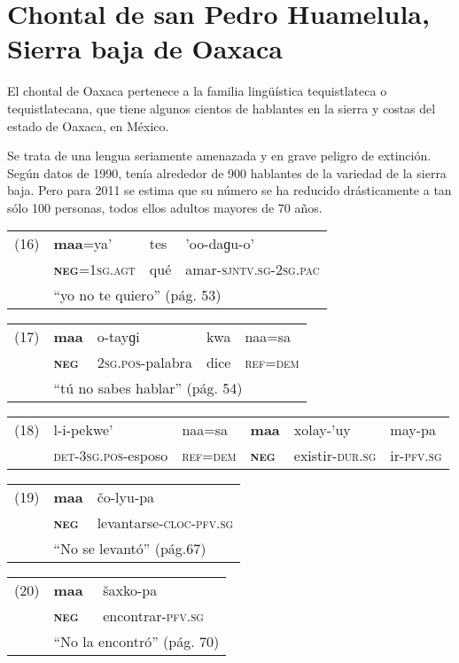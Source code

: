 \section*{Chontal de san Pedro Huamelula, Sierra baja de Oaxaca}

\noindent El chontal de Oaxaca pertenece a la familia lingüística tequistlateca o tequistlatecana, que tiene algunos cientos de hablantes en la sierra y costas del estado de Oaxaca, en México.

Se trata de una lengua seriamente amenazada y en grave peligro de extinción. Según datos de 1990, tenía alrededor de 900 hablantes de la variedad de la sierra baja. Pero para 2011 se estima que su número se ha reducido drásticamente a tan sólo 100 personas, todos ellos adultos mayores de 70 años. \vspace{0.5cm}

{\setmainfont{Charis SIL}

\begin{tabular}{llll}
(16) & \textbf{maa}=ya'& tes & 'oo-daɡu-o' \\
& \textsc{\textbf{neg}}=\textsc{1sg.agt} & qué & amar-\textsc{sjntv.sg-2sg.pac} \\
& \multicolumn{3}{l}{``yo no te quiero'' (pág. 53)}
\end{tabular} \vspace{0.5cm}

\begin{tabular}{lllll}
(17) & \textbf{maa} & o-tayɡi & kwa & naa=sa \\
& \textsc{\textbf{neg}} & \textsc{2sg.pos}-palabra & dice & \textsc{ref=dem} \\
& \multicolumn{4}{l}{``tú no sabes hablar'' (pág. 54)}
\end{tabular} \vspace{0.5cm}

\begin{tabular}{llllll}
(18) & l-i-pekwe’ & naa=sa & \textbf{maa} & xolay-’uy & may-pa \\
& \textsc{det-3sg.pos}-esposo & \textsc{ref=dem} & \textsc{\textbf{neg}} & existir-\textsc{dur.sg} & ir-\textsc{pfv.sg} \\
\end{tabular} \vspace{0.5cm}

\begin{tabular}{lll}
(19) & \textbf{maa} & čo-lyu-pa \\
& \textsc{\textbf{neg}} & levantarse-\textsc{cloc-pfv.sg} \\
& \multicolumn{2}{l}{``No se levantó'' (pág.67)}
\end{tabular} \vspace{0.5cm}

\begin{tabular}{lll}
(20) & \textbf{maa} & šaxko-pa \\
& \textsc{\textbf{neg}} & encontrar-\textsc{pfv.sg} \\
& \multicolumn{2}{l}{``No la encontró'' (pág. 70)}
\end{tabular} \vspace{0.5cm}

}

